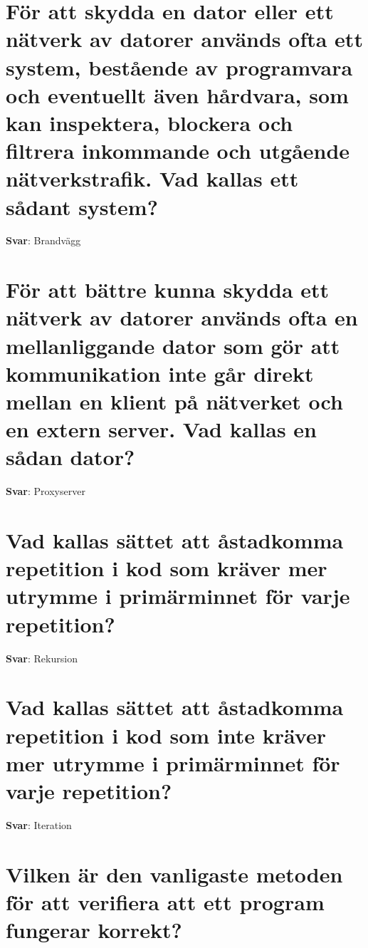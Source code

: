 \documentclass[a4paper,11pt,oneside]{book}
\begin{document}
\begin{sloppypar}
\section{F\"or att skydda en dator eller ett n\"atverk av datorer anv\"ands ofta ett system, best\r{a}ende av programvara och eventuellt \"aven h\r{a}rdvara, som kan inspektera, blockera och filtrera inkommande och utg\r{a}ende n\"atverkstrafik. Vad kallas ett s\r{a}dant system?}

\label{q:28:sa:sv:True}

\textbf{Svar}: Brandv\"agg



\section{F\"or att b\"attre kunna skydda ett n\"atverk av datorer anv\"ands ofta en mellanliggande dator som g\"or att kommunikation inte g\r{a}r direkt mellan en klient p\r{a} n\"atverket och en extern server. Vad kallas en s\r{a}dan dator?}

\label{q:29:sa:sv:True}

\textbf{Svar}: Proxyserver



\section{Vad kallas s\"attet att \r{a}stadkomma repetition i kod som kr\"aver mer utrymme i prim\"arminnet f\"or varje repetition?}

\label{q:31:sa:sv:True}

\textbf{Svar}: Rekursion



\section{Vad kallas s\"attet att \r{a}stadkomma repetition i kod som inte kr\"aver mer utrymme i prim\"arminnet f\"or varje repetition?}

\label{q:32:sa:sv:True}

\textbf{Svar}: Iteration



\section{Vilken \"ar den vanligaste metoden f\"or att verifiera att ett program fungerar korrekt?}

\label{q:33:sa:sv:True}


\end{sloppypar}
\end{document}
